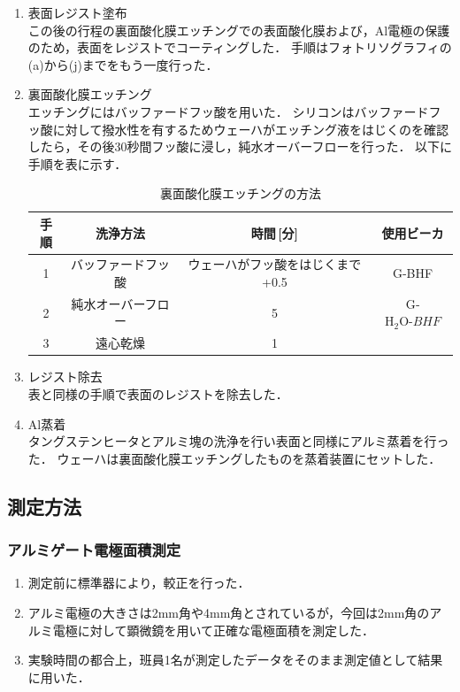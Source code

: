 \documentclass[11pt]{jarticle}
\begin{document}
\begin{enumerate}
			\item 表面レジスト塗布\\
				この後の行程の裏面酸化膜エッチングでの表面酸化膜および，Al電極の保護のため，表面をレジストでコーティングした．
				手順はフォトリソグラフィの(a)から(j)までをもう一度行った．

			\item 裏面酸化膜エッチング\\
				エッチングにはバッファードフッ酸を用いた．
				シリコンはバッファードフッ酸に対して撥水性を有するためウェーハがエッチング液をはじくのを確認したら，その後30秒間フッ酸に浸し，純水オーバーフローを行った．
				以下に手順を表に示す．
				\begin{table}[H]
				\begin{center}
				\caption{裏面酸化膜エッチングの方法}
				\label{tab:uraetching}
				\begin{tabular}{c|ccc} \toprule
					手順&洗浄方法&時間\,[分]&使用ビーカ\\ \hline
					1&バッファードフッ酸&ウェーハがフッ酸をはじくまで +0.5&G‐BHF\\
					2&純水オーバーフロー&5&G‐$\mathrm{H_{2}O}‐BHF$\\
					3&遠心乾燥&1&\\ \bottomrule
				\end{tabular}
				\end{center}
				\end{table}

			\item レジスト除去\\
				表と同様の手順で表面のレジストを除去した．

			\item Al蒸着\\
				タングステンヒータとアルミ塊の洗浄を行い表面と同様にアルミ蒸着を行った．
				ウェーハは裏面酸化膜エッチングしたものを蒸着装置にセットした．
		\end{enumerate}

		\subsection{測定方法}
			\subsubsection{アルミゲート電極面積測定}
				\begin{enumerate}
					\item 測定前に標準器により，較正を行った．
					\item アルミ電極の大きさは2mm角や4mm角とされているが，今回は2mm角のアルミ電極に対して顕微鏡を用いて正確な電極面積を測定した．
					\item 実験時間の都合上，班員1名が測定したデータをそのまま測定値として結果に用いた．
				\end{enumerate}
\end{document}
